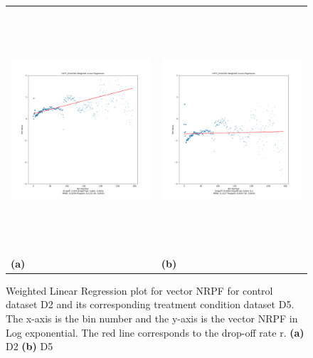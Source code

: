\documentclass[a4,center,fleqn]{NAR}
\begin{document}
\begin{figure} [ht]
\centering
\begin{tabular}{ll}
\includegraphics[width=9cm,height=9cm]{D2FP_D2mRNA.Log.WLR.png} & \includegraphics[width=9cm,height=9cm]{D5FP_D5mRNA.Log.WLR.png} \\
\textbf{(a)}   & \textbf{(b)}     \\[0.1pt]
\end{tabular}
\caption{Weighted Linear Regression plot for vector NRPF for control dataset D2 and its corresponding treatment condition dataset D5. The x-axis is the bin number and the y-axis is the vector NRPF in Log exponential. The red line corresponds to the drop-off rate r.
\textbf{(a)} D2
\textbf{(b)} D5
}
\label{fig2}
\end{figure}
\end{document}
